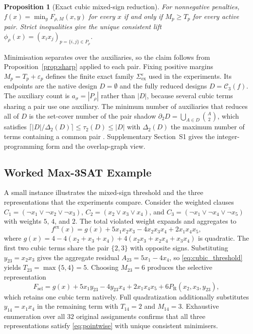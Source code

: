 \documentclass{ieeeaccess}
\newtheorem{proposition}{Proposition}
\newcommand{\PR}{P_{\mathrm{R}}}
\begin{document}
\begin{proposition}[Exact cubic mixed-sign reduction]
\label{prop:cubic}
For nonnegative penalties, $f(x)=\min_yF_{\rho,M}(x,y)$ for every $x$ if and only if
$M_p\ge T_p$ for every active pair. Strict inequalities give the unique consistent lift
$\phi_\rho(x)=(x_ix_j)_{p=\{i,j\}\in P_\rho}$.
\end{proposition}

Minimisation separates over the auxiliaries, so the claim follows from
Proposition~\ref{prop:sharp} applied to each pair. Fixing positive margins
$M_p=T_p+\varepsilon_p$ defines the finite exact family $\Sigma^{\varepsilon}_{\mathrm{ex}}$
used in the experiments. Its endpoints are the native design $D=\emptyset$ and the fully
reduced designs $D=\mathcal{C}_3(f)$. The auxiliary count is $a_\sigma=|P_\rho|$ rather than
$|D|$, because several cubic terms sharing a pair use one auxiliary. The minimum number of
auxiliaries that reduces all of $D$ is the set-cover number of the pair shadow
$\partial_2D=\bigcup_{A\in D}\binom{A}{2}$, which satisfies
$\lceil |D|/\Delta_2(D)\rceil\le\tau_2(D)\le|D|$ with $\Delta_2(D)$ the maximum number of
terms containing a common pair \cite{VermaLewisKochenberger2021,Schmidbauer2026}.
Supplementary Section~S1 gives the integer-programming form and the overlap-graph view.

\subsection{Worked Max-3SAT Example}
\label{sec:reduction:example}

A small instance illustrates the mixed-sign threshold and the three representations that the
experiments compare. Consider the weighted clauses
$C_1=(\neg x_1\vee\neg x_2\vee\neg x_3)$, $C_2=(x_2\vee x_3\vee x_4)$, and
$C_3=(\neg x_1\vee\neg x_4\vee\neg x_5)$ with weights $5$, $4$, and $2$. The total violated
weight expands and aggregates to
\begin{equation}
f^{\mathrm{ex}}(x)=g(x)+5x_1x_2x_3-4x_2x_3x_4+2x_1x_4x_5,
\label{eq:example_f}
\end{equation}
where $g(x)=4-4(x_2+x_3+x_4)+4(x_2x_3+x_2x_4+x_3x_4)$ is quadratic. The first two cubic
terms share the pair $\{2,3\}$ with opposite signs. Substituting $y_{23}=x_2x_3$ gives the
aggregate residual $A_{23}=5x_1-4x_4$, so \eqref{eq:cubic_threshold} yields
$T_{23}=\max\{5,4\}=5$. Choosing $M_{23}=6$ produces the selective representation
\begin{equation}
F_{\mathrm{sel}}=g(x)+5x_1y_{23}-4y_{23}x_4+2x_1x_4x_5+6\PR(x_2,x_3,y_{23}),
\label{eq:example_sel}
\end{equation}
which retains one cubic term natively. Full quadratization additionally substitutes
$y_{14}=x_1x_4$ in the remaining term with $T_{14}=2$ and $M_{14}=3$. Exhaustive enumeration
over all $32$ original assignments confirms that all three representations satisfy
\eqref{eq:pointwise} with unique consistent minimisers.
\end{document}
